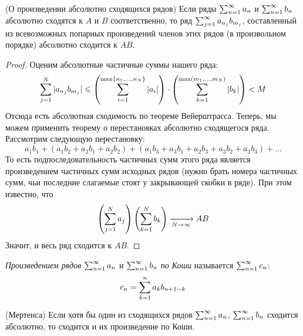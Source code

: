\begin{theorem} (О произведении абсолютно сходящихся рядов)
	Если ряды $\sum_{n = 1}^\infty a_n$ и $\sum_{n = 1}^\infty b_n$ абсолютно сходятся к $A$ и $B$ соответственно, то ряд $\sum_{j = 1}^\infty a_{n_j} b_{m_j}$, составленный из всевозможных попарных произведений членов этих рядов (в произвольном порядке) абсолютно сходится к $AB$.
\end{theorem}

\begin{proof}
	Оценим абсолютные частичные суммы нашего ряда:
	\[
		\sum\limits_{j = 1}^N |a_{n_j} b_{m_j}| \leqslant \left(\sum\limits_{i = 1}^{\max \{n_1, \ldots, n_N\}} |a_i|\right) \cdot \left(\sum\limits_{k = 1}^{\max (m_1, \ldots, m_N)} |b_k|\right) < M
	\]
	Отсюда есть абсолютная сходимость по теореме Вейерштрасса. Теперь, мы можем применить теорему о перестановках абсолютно сходящегося ряда. Рассмотрим следующую перестановку:
	\[
		a_1 b_1 + (a_1 b_2 + a_2 b_1 + a_2 b_2) + (a_1 b_3 + a_3 b_1 + a_2 b_3 + a_3 b_2 + a_3 b_3) + \ldots
	\]
	То есть подпоследовательность частичных сумм этого ряда является произведением частичных сумм исходных рядов (нужно брать номера частичных сумм, чьи последние слагаемые стоят у закрывающей скобки в ряде). При этом известно, что
	\[
		\left(\sum\limits_{j = 1}^N a_j\right)\left(\sum\limits_{k = 1}^N b_k\right) \xrightarrow[N \to \infty]{} AB
	\]
	Значит, и весь ряд сходится к $AB$.
\end{proof}

\begin{definition}
	\textit{Произведением рядов} $\sum_{n = 1}^\infty a_n$ и $\sum_{n = 1}^\infty b_n$ \textit{по Коши} называется $\sum_{n = 1}^\infty c_n$:
	\[
		c_n = \sum\limits_{k = 1}^n a_k b_{n + 1 - k}
	\]
\end{definition}

\begin{theorem} (Мертенса)
	Если хотя бы один из сходящихся рядов $\sum_{n = 1}^\infty a_n$, $\sum_{n = 1}^\infty b_n$ сходится абсолютно, то сходится и их произведение по Коши.
\end{theorem}

